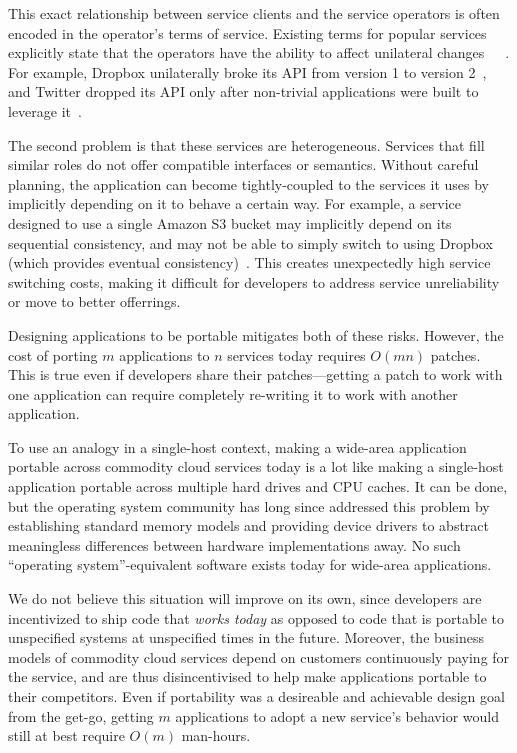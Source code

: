 This exact relationship between service clients and the service operators is often encoded
in the operator's terms of service.  Existing terms for popular services
explicitly state that the operators have the ability to affect unilateral
changes~\cite{amazon-tos}~\cite{google-tos}~\cite{dropbox-tos}.  For example,
Dropbox unilaterally broke its API from version 1 to version
2~\cite{dropbox-v2-api-psa}, and Twitter dropped its API only after non-trivial
applications were built to leverage it~\cite{twitter-api-deprecation-psa}.

The second problem is that these services are heterogeneous.  Services that fill similar roles
do not offer compatible interfaces or semantics.
Without careful planning, the application can become tightly-coupled to the
services it uses by implicitly depending on it to behave a certain way.  For
example, a service designed to use a single Amazon S3 bucket may implicitly
depend on its sequential consistency, and may not be able to simply switch to
using Dropbox (which provides eventual
consistency)~\cite{consistency-comparison-cloud-storage}.
This creates unexpectedly high service switching costs, making it
difficult for developers to address service unreliability or move to better
offerrings.

Designing applications to be portable mitigates both of
these risks.   However, the cost of porting $m$ applications to $n$ services
today requires $O(mn)$ patches.  This is true even if developers share their
patches---getting a patch to work with one application can require completely
re-writing it to work with another application.

To use an analogy in a single-host context, making a wide-area
application portable across commodity cloud services today is a lot like making
a single-host application portable across multiple hard drives and CPU caches.
It can be done, but the operating system community has long since addressed this
problem by establishing standard memory models and providing device drivers to
abstract meaningless differences between hardware implementations away.  No such
``operating system''-equivalent software exists today for wide-area
applications.

We do not believe this situation will improve on its own,
since developers are incentivized to ship code that \emph{works
today} as opposed to code that is portable to unspecified systems at unspecified
times in the future.  Moreover, the business models of commodity cloud services
depend on customers continuously paying for the service, and are thus
disincentivised to help make applications portable to their competitors.
Even if portability was a desireable and achievable design goal from the get-go,
getting $m$ applications to adopt a new service's behavior would still at best
require $O(m)$ man-hours.

